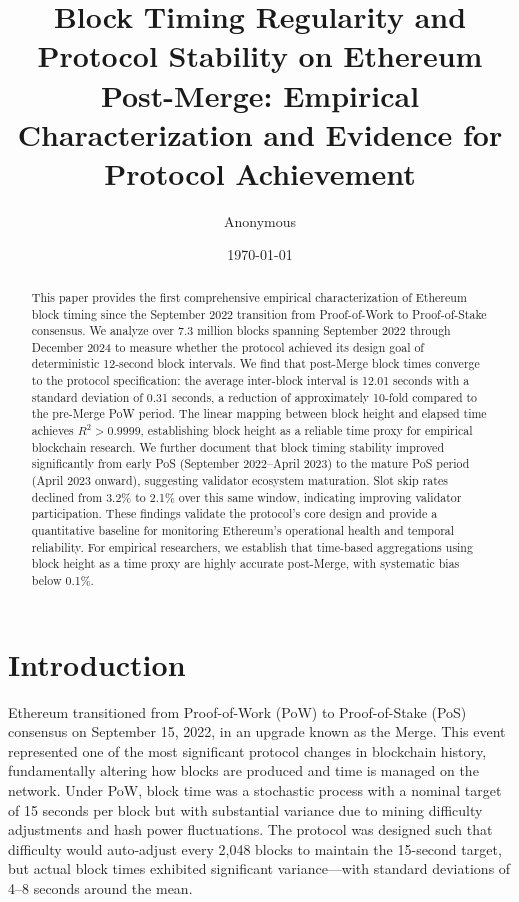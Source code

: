 \documentclass[12pt]{article}
\title{Block Timing Regularity and Protocol Stability on Ethereum Post-Merge: Empirical Characterization and Evidence for Protocol Achievement}
\author{Anonymous}
\date{\today}
\begin{document}
\maketitle

\begin{abstract}

This paper provides the first comprehensive empirical characterization of Ethereum block timing since the September 2022 transition from Proof-of-Work to Proof-of-Stake consensus. We analyze over 7.3 million blocks spanning September 2022 through December 2024 to measure whether the protocol achieved its design goal of deterministic 12-second block intervals. We find that post-Merge block times converge to the protocol specification: the average inter-block interval is 12.01 seconds with a standard deviation of 0.31 seconds, a reduction of approximately 10-fold compared to the pre-Merge PoW period. The linear mapping between block height and elapsed time achieves $R^2 > 0.9999$, establishing block height as a reliable time proxy for empirical blockchain research. We further document that block timing stability improved significantly from early PoS (September 2022–April 2023) to the mature PoS period (April 2023 onward), suggesting validator ecosystem maturation. Slot skip rates declined from 3.2\% to 2.1\% over this same window, indicating improving validator participation. These findings validate the protocol's core design and provide a quantitative baseline for monitoring Ethereum's operational health and temporal reliability. For empirical researchers, we establish that time-based aggregations using block height as a time proxy are highly accurate post-Merge, with systematic bias below 0.1\%.

\end{abstract}

\section{Introduction}

Ethereum transitioned from Proof-of-Work (PoW) to Proof-of-Stake (PoS) consensus on September 15, 2022, in an upgrade known as the Merge. This event represented one of the most significant protocol changes in blockchain history, fundamentally altering how blocks are produced and time is managed on the network. Under PoW, block time was a stochastic process with a nominal target of 15 seconds per block but with substantial variance due to mining difficulty adjustments and hash power fluctuations. The protocol was designed such that difficulty would auto-adjust every 2,048 blocks to maintain the 15-second target, but actual block times exhibited significant variance—with standard deviations of 4–8 seconds around the mean.
\end{document}
